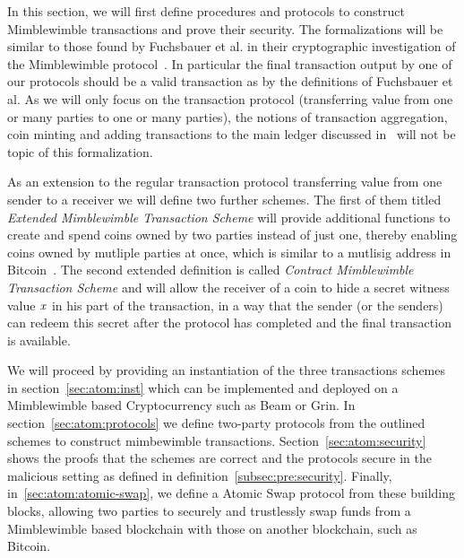 In this section, we will first define procedures and protocols to construct Mimblewimble transactions and prove their security.
The formalizations will be similar to those found by Fuchsbauer et al. in their cryptographic investigation of the Mimblewimble protocol~\cite{fuchsbauer2019aggregate}.
In particular the final transaction output by one of our protocols should be a valid transaction as by the definitions of Fuchsbauer et al.
As we will only focus on the transaction protocol (transferring value from one or many parties to one or many parties), the notions of transaction aggregation, coin minting and adding transactions to the main ledger discussed in~\cite{fuchsbauer2019aggregate} will not be topic of this formalization.


As an extension to the regular transaction protocol transferring value from one sender to a receiver we will define two further schemes.
The first of them titled \emph{Extended Mimblewimble Transaction Scheme} will provide additional functions to create and spend coins owned by two parties instead of just one, thereby enabling coins owned by mutliple parties at once, which is similar to a mutlisig address in Bitcoin~\cite{antonopoulos2014mastering}.
The second extended definition is called \emph{Contract Mimblewimble Transaction Scheme} and will allow the receiver
of a coin to hide a secret witness value $\mathit{x}$ in his part  of the transaction, in a way that the sender (or the senders) can redeem this secret after the protocol has completed and the final transaction is available.

We will proceed by providing an instantiation of the three  transactions schemes in section~\ref{sec:atom:inst} which can be implemented and deployed on a Mimblewimble based Cryptocurrency such as Beam or Grin.
In section~\ref{sec:atom:protocols} we define two-party protocols from the outlined schemes to construct mimbewimble transactions.
Section~\ref{sec:atom:security} shows the proofs that the schemes are correct and the protocols secure in the malicious setting as defined in definition~\ref{subsec:pre:security}.
Finally, in~\ref{sec:atom:atomic-swap}, we define a Atomic Swap protocol from these building blocks, allowing two parties to securely and trustlessly swap funds from a Mimblewimble based blockchain with those on another blockchain, such as Bitcoin.

